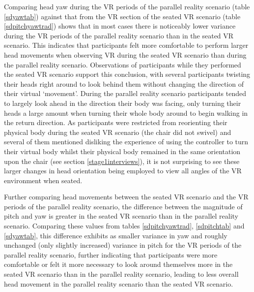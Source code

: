 Comparing head yaw during the VR periods of the parallel reality scenario (table \ref{sdyawtab}) against that from the VR section of the seated VR scenario (table \ref{sdpitchyawtrad}) shows that in most cases there is noticeably lower variance during the VR periods of the parallel reality scenario than in the seated VR scenario. This indicates that participants felt more comfortable to perform larger head movements when observing VR during the seated VR scenario than during the parallel reality scenario. Observations of participants while they performed the seated VR scenario support this conclusion, with several participants twisting their heads right around to look behind them without changing the direction of their virtual `movement'. During the parallel reality scenario participants tended to largely look ahead in the direction their body was facing, only turning their heads a large amount when turning their whole body around to begin walking in the return direction. As participants were restricted from reorienting their physical body during the seated VR scenario (the chair did not swivel) and several of them mentioned disliking the experience of using the controller to turn their virtual body whilst their physical body remained in the same orientation upon the chair (see section \ref{stage1interviews}), it is not surprising to see these larger changes in head orientation being employed to view all angles of the VR environment when seated.

Further comparing head movements between the seated VR scenario and the VR periods of the parallel reality scenario, the difference between the magnitude of pitch and yaw is greater in the seated VR scenario than in the parallel reality scenario. Comparing these values from tables \ref{sdpitchyawtrad}, \ref{sdpitchtab} and \ref{sdyawtab}, this difference exhibits as smaller variance in yaw and roughly unchanged (only slightly increased) variance in pitch for the VR periods of the parallel reality scenario, further indicating that participants were more comfortable or felt it more necessary to look around themselves more in the seated VR scenario than in the parallel reality scenario, leading to less overall head movement in the parallel reality scenario than the seated VR scenario.


